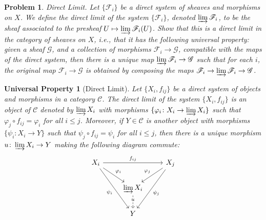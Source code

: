 \documentclass[12pt,letterpaper]{article}
\newtheorem*{universalproperty}{Universal Property}
\newtheorem{problem}{Problem}[section]
\theoremstyle{definition}
\theoremstyle{remark}
\numberwithin{equation}{section}
\numberwithin{figure}{problem}
\begin{document}
\begin{problem}
  \emph{Direct Limit}. Let $\{\mathscr{F}_i\}$ be a direct system of sheaves and morphisms on $X$. We define the \emph{direct limit} of the system $\{\mathscr{F}_i\}$, denoted $\varinjlim \mathscr{F}_i$, to be the sheaf associated to the presheaf $U \mapsto \varinjlim \mathscr{F}_i(U)$. Show that this is a direct limit in the category of sheaves on $X$, i.e., that it has the following universal property: given a sheaf $\mathscr{G}$, and a collection of morphisms $\mathscr{F}_i \to \mathscr{G}$, compatible with the maps of the direct system, then there is a unique map $\varinjlim \mathscr{F}_i \to \mathscr{G}$ such that for each $i$, the original map $\mathscr{F}_i \to \mathscr{G}$ is obtained by composing the maps $\mathscr{F}_i \to \varinjlim\mathscr{F}_i \to \mathscr{G}$.
\end{problem}
\begin{universalproperty}[Direct Limit]
  Let $\{X_i,f_{ij}\}$ be a direct system of objects and morphisms in a category $\mathscr{C}$. The \emph{direct limit} of the system $\{X_i,f_{ij}\}$ is an object of $\mathscr{C}$ denoted by $\varinjlim X_i$ with morphisms $\{\varphi_i \colon X_i \to \varinjlim X_i\}$ such that $\varphi_j \circ f_{ij} = \varphi_i$ for all $i \le j$. Moreover, if $Y \in \mathscr{C}$ is another object with morphisms $\{\psi_i\colon X_i \to Y\}$ such that $\psi_j \circ f_{ij} = \psi_i$ for all $i \le j$, then there is a unique morphism $u\colon \varinjlim X_i \to Y$ making the following diagram commute:
  \begin{equation*}
    \begin{tikzcd}
      X_i \arrow{rr}{f_{ij}}\arrow{dr}{\varphi_i}\arrow{ddr}[swap]{\psi_i} & & X_j\arrow{dl}[swap]{\varphi_j}\arrow{ddl}{\psi_j}\\
      & \varinjlim X_i\arrow[dashed]{d}[description,yshift=3pt]{u}\\
      & Y
    \end{tikzcd}
  \end{equation*}
\end{universalproperty}
\end{document}
